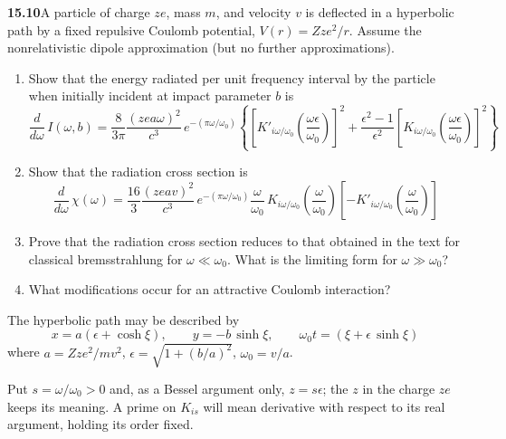 \par\bigskip
\noindent\textbf{15.10}\quad A particle of charge $ze$, mass $m$, and velocity $v$ is deflected in a hyperbolic path by a fixed repulsive Coulomb potential, $V(r)=Zze^{2}/r$. Assume the nonrelativistic dipole approximation (but no further approximations).
\begin{enumerate}
\item[(a)] Show that the energy radiated per unit frequency interval by the particle when initially incident at impact parameter $b$ is
\[
\frac{d}{d\omega}\,I(\omega,b)=\frac{8}{3\pi}\frac{(zea\omega)^{2}}{c^{3}}\,e^{-(\pi\omega/\omega_{0})}\!\left\{\left[K'_{i\omega/\omega_{0}}\!\left(\frac{\omega\epsilon}{\omega_{0}}\right)\right]^{2}+\frac{\epsilon^{2}-1}{\epsilon^{2}}\left[K_{i\omega/\omega_{0}}\!\left(\frac{\omega\epsilon}{\omega_{0}}\right)\right]^{2}\right\}
\]
\item[(b)] Show that the radiation cross section is
\[
\frac{d}{d\omega}\,\chi(\omega)=\frac{16}{3}\frac{(zeav)^{2}}{c^{3}}\,e^{-(\pi\omega/\omega_{0})}\frac{\omega}{\omega_{0}}\,K_{i\omega/\omega_{0}}\!\left(\frac{\omega}{\omega_{0}}\right)\!\left[-K'_{i\omega/\omega_{0}}\!\left(\frac{\omega}{\omega_{0}}\right)\right]
\]
\item[(c)] Prove that the radiation cross section reduces to that obtained in the text for classical bremsstrahlung for $\omega\ll\omega_{0}$. What is the limiting form for $\omega\gg\omega_{0}$?
\item[(d)] What modifications occur for an attractive Coulomb interaction?
\end{enumerate}
The hyperbolic path may be described by
\[
x=a(\epsilon+\cosh\xi),\qquad y=-b\,\sinh\xi,\qquad\omega_{0}t=(\xi+\epsilon\,\sinh\xi)
\]
where $a=Zze^{2}/mv^{2}$, $\epsilon=\sqrt{1+(b/a)^{2}}$, $\omega_{0}=v/a$.
\solution

Put $s=\omega/\omega_0>0$ and, as a Bessel argument only, $z=s\epsilon$; the $z$ in the charge $ze$ keeps its meaning.  A prime on $K_{is}$
will mean derivative with respect to its real argument, holding
its order fixed.

